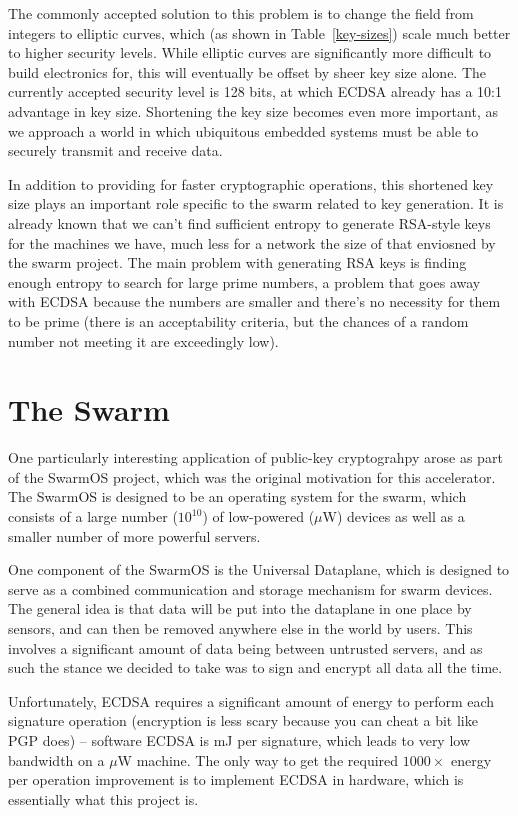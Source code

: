 \documentclass[twocolumn]{article}
\begin{document}
The commonly accepted solution to this problem is to change the field
from integers to elliptic curves, which (as shown in
Table~\ref{key-sizes}) scale much better to higher security levels.
While elliptic curves are significantly more difficult to build
electronics for, this will eventually be offset by sheer key size
alone.  The currently accepted security level is 128 bits, at which
ECDSA already has a 10:1 advantage in key size.  Shortening the key 
size becomes even more important, as we approach a world in which 
ubiquitous embedded systems must be able to securely transmit and 
receive data.

In addition to providing for faster cryptographic operations, this
shortened key size plays an important role specific to the swarm
related to key generation.  It is already known\cite{halderman-shared}
that we can't find sufficient entropy to generate RSA-style keys for
the machines we have, much less for a network the size of that
enviosned by the swarm project.  The main problem with generating RSA
keys is finding enough entropy to search for large prime numbers, a
problem that goes away with ECDSA because the numbers are smaller and
there's no necessity for them to be prime (there is an acceptability
criteria, but the chances of a random number not meeting it are
exceedingly low).

\section{The Swarm}

One particularly interesting application of public-key cryptograhpy
arose as part of the SwarmOS project, which was the original
motivation for this accelerator.  The SwarmOS is designed to be an
operating system for the swarm, which consists of a large number
($10^{10}$) of low-powered ($\mu$W) devices as well as a smaller
number of more powerful servers.

One component of the SwarmOS is the Universal Dataplane, which is
designed to serve as a combined communication and storage mechanism
for swarm devices.  The general idea is that data will be put into the
dataplane in one place by sensors, and can then be removed anywhere
else in the world by users.  This involves a significant amount of
data being between untrusted servers, and as such the stance we
decided to take was to sign and encrypt all data all the time.

Unfortunately, ECDSA requires a significant amount of energy to
perform each signature operation (encryption is less scary because you
can cheat a bit like PGP does) -- software ECDSA is mJ per signature,
which leads to very low bandwidth on a $\mu$W machine.  The only way
to get the required $1000\times$ energy per operation improvement is
to implement ECDSA in hardware, which is essentially what this project
is.
\end{document}
